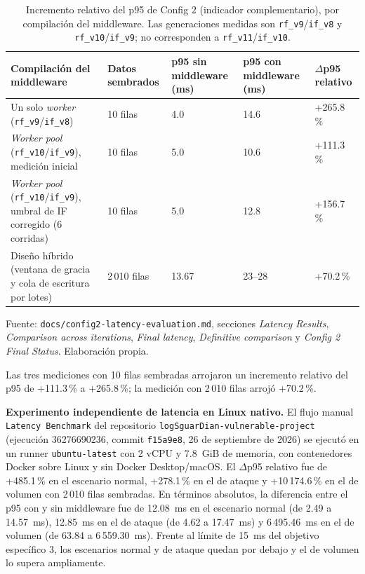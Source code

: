 \begin{table}[htbp]
\centering
\footnotesize
\setlength{\tabcolsep}{3pt}
\begin{tabular}{|p{4.0cm}|p{2.2cm}|p{2.0cm}|p{2.0cm}|p{2.2cm}|}
\hline
\textbf{Compilación del middleware} & \textbf{Datos sembrados} & \textbf{p95 sin middleware (ms)} & \textbf{p95 con middleware (ms)} & \textbf{$\Delta$p95 relativo} \\ \hline
Un solo \textit{worker} (\texttt{rf\_v9}/\texttt{if\_v8}) & 10 filas & 4.0 & 14.6 & +265.8\,\% \\ \hline
\textit{Worker pool} (\texttt{rf\_v10}/\texttt{if\_v9}), medición inicial & 10 filas & 5.0 & 10.6 & +111.3\,\% \\ \hline
\textit{Worker pool} (\texttt{rf\_v10}/\texttt{if\_v9}), umbral de IF corregido (6 corridas) & 10 filas & 5.0 & 12.8 & +156.7\,\% \\ \hline
Diseño híbrido (ventana de gracia y cola de escritura por lotes) & 2\,010 filas & 13.67 & 23--28 & +70.2\,\% \\ \hline
\end{tabular}
\caption{Incremento relativo del p95 de Config 2 (indicador complementario), por compilación del middleware. Las generaciones medidas son \texttt{rf\_v9}/\texttt{if\_v8} y \texttt{rf\_v10}/\texttt{if\_v9}; no corresponden a \texttt{rf\_v11}/\texttt{if\_v10}.}
\label{tabla:res-config2-latencia}
\par\smallskip\footnotesize Fuente: \texttt{docs/config2-latency-evaluation.md}, secciones \textit{Latency Results}, \textit{Comparison across iterations}, \textit{Final latency}, \textit{Definitive comparison} y \textit{Config 2 Final Status}. Elaboración propia.
\end{table}

Las tres mediciones con 10 filas sembradas arrojaron un incremento relativo del p95 de +111.3\,\% a +265.8\,\%; la medición con 2\,010 filas arrojó +70.2\,\%.

\noindent\textbf{Experimento independiente de latencia en Linux nativo.} El flujo manual \texttt{Latency Benchmark} del repositorio \texttt{logSguarDian-vulnerable-project} (ejecución 36276690236, commit \texttt{f15a9e8}, 26 de septiembre de 2026) se ejecutó en un runner \texttt{ubuntu-latest} con 2 vCPU y 7.8~GiB de memoria, con contenedores Docker sobre Linux y sin Docker Desktop/macOS. El $\Delta$p95 relativo fue de +485.1\,\% en el escenario normal, +278.1\,\% en el de ataque y +10\,174.6\,\% en el de volumen con 2\,010 filas sembradas. En términos absolutos, la diferencia entre el p95 con y sin middleware fue de 12.08~ms en el escenario normal (de 2.49 a 14.57~ms), 12.85~ms en el de ataque (de 4.62 a 17.47~ms) y 6\,495.46~ms en el de volumen (de 63.84 a 6\,559.30~ms). Frente al límite de 15~ms del objetivo específico 3, los escenarios normal y de ataque quedan por debajo y el de volumen lo supera ampliamente.

